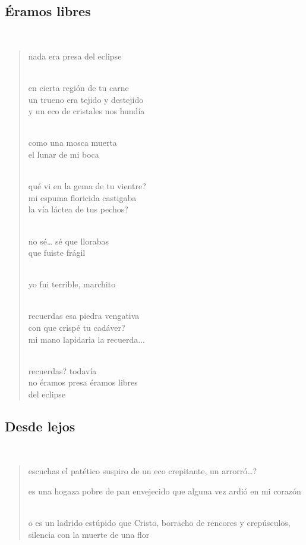 \documentclass[a4paper, 12pt]{article}
\begin{document}
\pagebreak 
\subsection{Éramos libres}
~

\begin{verse}
nada era presa del eclipse\\
~ 

en cierta región de tu carne\\
un trueno era tejido y destejido\\
y un eco de cristales nos hundía\\
~ 

como una mosca muerta\\
el lunar de mi boca\\
~ 

qué vi en la gema de tu vientre?\\
mi espuma floricida castigaba\\
la vía láctea de tus pechos?\\
~ 

no sé… sé que llorabas\\
que fuiste frágil\\
~ 

yo fui terrible, marchito\\
~ 

recuerdas esa piedra vengativa\\
con que crispé tu cadáver?\\
mi mano lapidaria la recuerda...\\
~ 

recuerdas? todavía\\
no éramos presa éramos libres\\
del eclipse\\

\end{verse}

\pagebreak 
\subsection{Desde lejos}
~

\begin{verse}
escuchas el patético suspiro
de un eco crepitante, un arrorró\ldots?
~

es una hogaza pobre de pan envejecido 
que alguna vez ardió en mi corazón 
~

o es un ladrido estúpido que Cristo,
borracho de rencores y crepúsculos,
silencia con la muerte de una flor
\end{verse}
\end{document}
